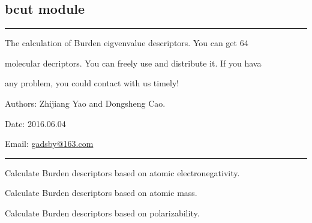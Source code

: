 \documentclass[letterpaper,10pt,english]{sphinxmanual}
\begin{document}

\begin{fulllineitems}
\label{reference/basak:basak.Getbasak}
\end{fulllineitems}



\subsection{bcut module}
\label{reference/bcut:bcut-module}\label{reference/bcut:module-bcut}\label{reference/bcut::doc}

\bigskip\hrule{}\bigskip


The calculation of Burden eigvenvalue descriptors. You can get 64

molecular decriptors. You can freely use and distribute it. If you hava

any problem, you could contact with us timely!

Authors: Zhijiang Yao and Dongsheng Cao.

Date: 2016.06.04

Email: \href{mailto:gadsby@163.com}{gadsby@163.com}


\bigskip\hrule{}\bigskip


\begin{fulllineitems}
\label{reference/bcut:bcut.CalculateBurdenElectronegativity}
Calculate Burden descriptors based on atomic electronegativity.

\end{fulllineitems}


\begin{fulllineitems}
\label{reference/bcut:bcut.CalculateBurdenMass}
Calculate Burden descriptors based on atomic mass.

\end{fulllineitems}


\begin{fulllineitems}
\label{reference/bcut:bcut.CalculateBurdenPolarizability}
Calculate Burden descriptors based on polarizability.

\end{fulllineitems}
\end{document}
